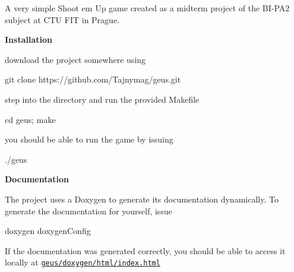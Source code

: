 A very simple Shoot em Up game created as a midterm project of the B\+I-\/\+P\+A2 subject at C\+TU F\+IT in Prague.

{\bfseries Installation}


\begin{DoxyItemize}
\item download the project somewhere using \begin{DoxyVerb}  git clone https://github.com/Tajnymag/geus.git
\end{DoxyVerb}

\item step into the directory and run the provided Makefile \begin{DoxyVerb}  cd geus;
  make
\end{DoxyVerb}

\item you should be able to run the game by issuing \begin{DoxyVerb}  ./geus
\end{DoxyVerb}

\end{DoxyItemize}

{\bfseries Documentation}

The project uses a Doxygen to generate it\textquotesingle{}s documentation dynamically. To generate the documentation for yourself, issue \begin{DoxyVerb}doxygen doxygenConfig
\end{DoxyVerb}


If the documentation was generated correctly, you should be able to access it locally at \href{doxygen/html/index.html}{\tt geus/doxygen/html/index.\+html} 